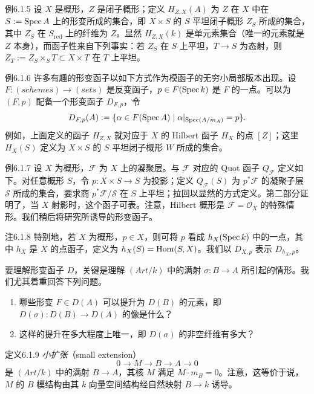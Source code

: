 \begin{origstatement}{例}{6.1.5}\label{ch06:6.1.5}
设 $X$ 是概形，$Z$ 是闭子概形；定义 $H_{Z,X}(A)$ 为 $Z$ 在 $X$ 中在 $S:=\operatorname{Spec} A$ 上的形变所成的集合，即 $X\times S$ 的 $S$ 平坦闭子概形 $Z_S$ 所成的集合，其中 $Z_S$ 在 $S_{\mathrm{red}}$ 上的纤维为 $Z$。显然 $H_{Z,X}(k)$ 是单元素集合（唯一的元素就是 $Z$ 本身），而函子性来自下列事实：若 $Z_S$ 在 $S$ 上平坦，$T\to S$ 为态射，则 $Z_T:=Z_S\times_S T\subset X\times T$ 在 $T$ 上平坦。
\end{origstatement}
\begin{origstatement}{例}{6.1.6}\label{ch06:6.1.6}
许多有趣的形变函子以如下方式作为模函子的无穷小局部版本出现。设 $F:(schemes)\to(sets)$ 是反变函子，$p\in F(\operatorname{Spec} k)$ 是 $F$ 的一点。可以为 $(F,p)$ 配备一个形变函子 $D_{F,p}$，令
\[
D_{F,p}(A):=\{\alpha\in F(\operatorname{Spec} A)\mid
\alpha|_{\operatorname{Spec}(A/m_A)}=p\}.
\]
例如，上面定义的函子 $H_{Z,X}$ 就对应于 $X$ 的 Hilbert 函子 $H_X$ 的点 $[Z]$；这里 $H_X(S)$ 定义为 $X\times S$ 的 $S$ 平坦闭子概形 $W$ 所成的集合。
\end{origstatement}
\begin{origstatement}{例}{6.1.7}\label{ch06:6.1.7}
设 $X$ 为概形，$\mathcal F$ 为 $X$ 上的凝聚层。与 $\mathcal F$ 对应的 Quot 函子 $Q_{\mathcal F}$ 定义如下。对任意概形 $S$，令 $p:X\times S\to S$ 为投影；定义 $Q_{\mathcal F}(S)$ 为 $p^*\mathcal F$ 的凝聚子层 $\mathcal S$ 所成的集合，要求商 $p^*\mathcal F/\mathcal S$ 在 $S$ 上平坦；拉回以显然的方式定义。第二部分证明了，当 $X$ 射影时，这个函子可表。注意，Hilbert 概形是 $\mathcal F=\mathcal O_X$ 的特殊情形。我们稍后将研究所诱导的形变函子。
\end{origstatement}
\begin{origstatement}{注}{6.1.8}\label{ch06:6.1.8}
特别地，若 $X$ 为概形，$p\in X$，则可将 $p$ 看成 $h_X(\operatorname{Spec} k)$ 中的一点，其中 $h_X$ 是 $X$ 的点函子，定义为 $h_X(S)=\operatorname{Hom}(S,X)$。我们以 $D_{X,p}$ 表示 $D_{h_X,p}$。
\end{origstatement}
要理解形变函子 $D$，关键是理解 $(Art/k)$ 中的满射 $\sigma:B\to A$ 所引起的情形。我们尤其着重回答下列问题。
\begin{enumerate}[label=(\arabic*)]
\item 哪些形变 $F\in D(A)$ 可以提升为 $D(B)$ 的元素，即 $D(\sigma):D(B)\to D(A)$ 的像是什么？
\item 这样的提升在多大程度上唯一，即 $D(\sigma)$ 的非空纤维有多大？
\end{enumerate}
\begin{origstatement}{定义}{6.1.9}\label{ch06:6.1.9}
\emph{小扩张}（small extension）
\[
0\longrightarrow M\longrightarrow B\longrightarrow A\longrightarrow0
\]
是 $(Art/k)$ 中的满射 $B\to A$，其核 $M$ 满足 $M\cdot m_B=0$。注意，这等价于说，$M$ 的 $B$ 模结构由其 $k$ 向量空间结构经自然映射 $B\to k$ 诱导。
\end{origstatement}
